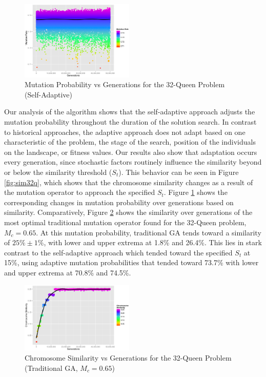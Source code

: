 \documentclass[conference]{IEEEtran}
\begin{document}
\begin{figure}[htp]
\centerline{\includegraphics[width=0.48\textwidth]{figures/mutation_32q_3.png}}
\caption{Mutation Probability vs Generations for the 32-Queen Problem (Self-Adaptive)} 
\label{fig:mutation32q}
\end{figure}

Our analysis of the algorithm shows that the self-adaptive approach adjusts the mutation probability throughout the duration of the solution search. In contrast to historical approaches, the adaptive approach does not adapt based on one characteristic of the problem, the stage of the search, position of the individuals on the landscape, or fitness values. Our results also show that adaptation occurs every generation, since stochastic factors routinely influence the similarity beyond or below the similarity threshold ($S_{t}$). This behavior can be seen in Figure \ref{fig:sim32q}, which shows that the chromosome similarity changes as a result of the mutation operator to approach the specified $S_{t}$. Figure \ref{fig:mutation32q} shows the corresponding changes in mutation probability over generations based on similarity. Comparatively, Figure \ref{fig:bestfixedn32q} shows the similarity over generations of the most optimal traditional mutation operator found for the 32-Queen problem, $M_{c} = 0.65$. At this mutation probability, traditional GA tends toward a similarity of $25\% \pm 1\%$, with lower and upper extrema at 1.8\% and 26.4\%. This lies in stark contrast to the self-adaptive approach which tended toward the specified $S_{t}$ at 15\%, using adaptive mutation probabilities that tended toward 73.7\% with lower and upper extrema at 70.8\% and 74.5\%.

\begin{figure}[htp]
\centerline{\includegraphics[width=0.48\textwidth]{figures/similarity_065_32q_3.png}}
\caption{Chromosome Similarity vs Generations for the 32-Queen Problem (Traditional GA, $M_{c} = 0.65$)} 
\label{fig:bestfixedn32q}
\end{figure}
\end{document}
